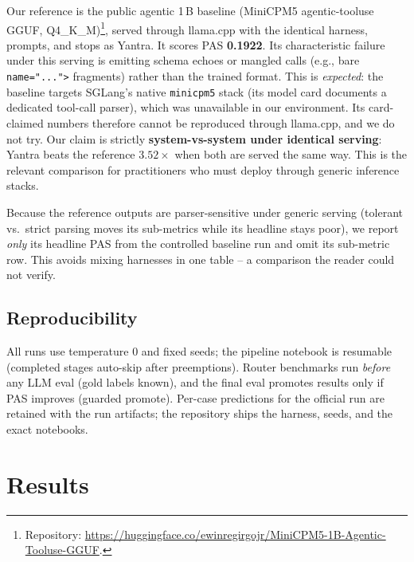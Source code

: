 \documentclass[11pt]{article}
\newcommand{\code}[1]{\texttt{#1}}
\begin{document}
Our reference is the public agentic 1\,B baseline (MiniCPM5 agentic-tooluse
GGUF, Q4\_K\_M)\footnote{Repository:
\url{https://huggingface.co/ewinregirgojr/MiniCPM5-1B-Agentic-Tooluse-GGUF}.},
served through llama.cpp with the identical harness, prompts, and stops as
Yantra. It scores PAS \textbf{0.1922}. Its characteristic failure under this
serving is emitting schema echoes or mangled calls (e.g., bare
\code{name="...">} fragments) rather than the trained format. This is
\emph{expected}: the baseline targets SGLang's native \code{minicpm5} stack (its
model card documents a dedicated tool-call parser), which was unavailable in our
environment. Its card-claimed numbers therefore cannot be reproduced through
llama.cpp, and we do not try. Our claim is strictly \textbf{system-vs-system
under identical serving}: Yantra beats the reference $3.52\times$ when both are
served the same way. This is the relevant comparison for practitioners who must
deploy through generic inference stacks.

Because the reference outputs are parser-sensitive under generic serving
(tolerant vs.\ strict parsing moves its sub-metrics while its headline stays
poor), we report \emph{only} its headline PAS from the controlled baseline run
and omit its sub-metric row. This avoids mixing harnesses in one table -- a
comparison the reader could not verify.

\subsection{Reproducibility}
\label{sec:repro}

All runs use temperature 0 and fixed seeds; the pipeline notebook is resumable
(completed stages auto-skip after preemptions). Router benchmarks run
\emph{before} any LLM eval (gold labels known), and the final eval promotes
results only if PAS improves (guarded promote). Per-case predictions for the
official run are retained with the run artifacts; the repository ships the
harness, seeds, and the exact notebooks.

\section{Results}
\label{sec:results}
\end{document}
